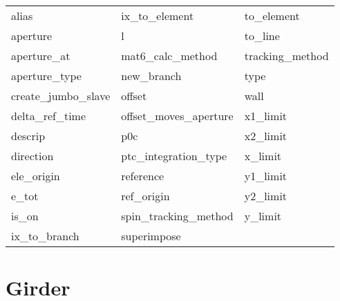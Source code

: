  \begin{tabular}{lll} \toprule
alias                       & ix_to_element               & to_element                  \\
aperture                    & l                           & to_line                     \\
aperture_at                 & mat6_calc_method            & tracking_method             \\
aperture_type               & new_branch                  & type                        \\
create_jumbo_slave          & offset                      & wall                        \\
delta_ref_time              & offset_moves_aperture       & x1_limit                    \\
descrip                     & p0c                         & x2_limit                    \\
direction                   & ptc_integration_type        & x_limit                     \\
ele_origin                  & reference                   & y1_limit                    \\
e_tot                       & ref_origin                  & y2_limit                    \\
is_on                       & spin_tracking_method        & y_limit                     \\
ix_to_branch                & superimpose                 &                             \\
 \bottomrule
 \end{tabular}
 \vfill
 
 \section{Girder}
 \label{s:list.girder}
 
